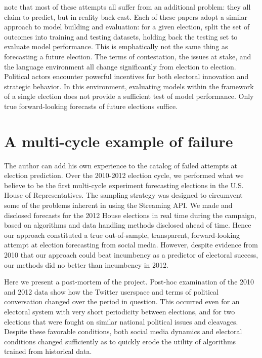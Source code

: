 \documentclass{article}
\begin{document}
\cite{metaxas2011not} note that most of these attempts all suffer from
an additional problem: they all claim to predict, but in reality
back-cast. Each of these papers adopt a similar approach to model
building and evaluation: for a given election, split the set of
outcomes into training and testing datasets, holding back the testing
set to evaluate model performance. This is emphatically not the same
thing as forecasting a future election. The terms of contestation, the
issues at stake, and the language environment all change significantly
from election to election. Political actors encounter powerful
incentives for both electoral innovation and strategic behavior. In
this environment, evaluating models within the framework of a single
election does not provide a sufficient test of model performance. Only
true forward-looking forecasts of future elections suffice.


\section{A multi-cycle example of failure}
\label{sec:multi-cycle-example}


The author can add his own experience to the catalog of failed
attempts at election prediction. Over the 2010-2012 election cycle, we
performed what we believe to be the first multi-cycle experiment
forecasting elections in the U.S. House of Representatives. The
sampling strategy was designed to circumvent some of the problems
inherent in using the Streaming API. We made and disclosed forecasts
for the 2012 House elections in real time during the campaign, based
on algorithms and data handling methods disclosed ahead of time. Hence
our approach constituted a true out-of-sample, transparent, forward-looking attempt
at election forecasting from social media. However, despite evidence
from 2010 that our approach could beat incumbency as a predictor of
electoral success, our methods did no better than incumbency in 2012.

Here we present a post-mortem of the project. Post-hoc examination of
the 2010 and 2012 data show how the Twitter userspace and terms of
political conversation changed over the period in question. This
occurred even for an electoral system with very short periodicity
between elections, and for two elections that were fought on similar
national political issues and cleavages. Despite these favorable
conditions, both social media dynamics and electoral conditions
changed sufficiently as to quickly erode the utility of algorithms
trained from historical data. 
\end{document}
